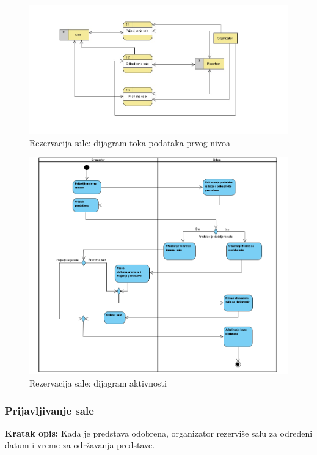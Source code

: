 \documentclass[a4paper]{article}
\begin{document}
\begin{figure}[H]
  \begin{center}
      \includegraphics[width=160mm]{../images/dfd2_rezervisanje_sala.jpg}
  \end{center}
  \caption{Rezervacija sale: dijagram toka podataka prvog nivoa}
  \label{dfd2_rezervisanje_sala}
\end{figure}

\begin{figure}[H]
  \begin{center}
      \includegraphics[width=160mm]{../images/activity_rezervacija_sala.png}
  \end{center}
  \caption{Rezervacija sale: dijagram aktivnosti}
  \label{activity_rezervacija_sala}
\end{figure}

\subsubsection{Prijavljivanje sale}
\noindent\textbf{Kratak opis:} Kada je predstava odobrena, organizator rezerviše salu za određeni datum i vreme za održavanja predstave. 
\end{document}
